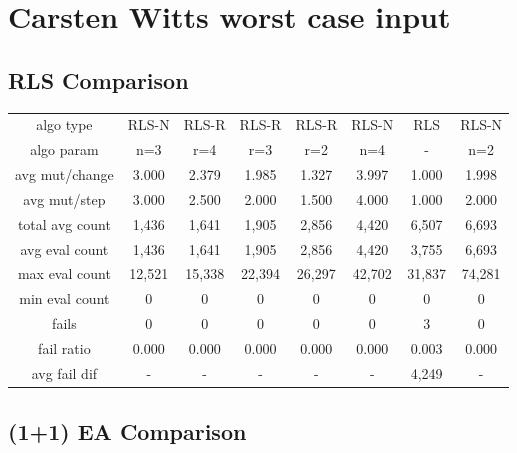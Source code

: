 
\section{Carsten Witts worst case input}

\subsection{RLS Comparison}


\begin{tabular}[h]{cccccccc}
algo type&         RLS-N&  RLS-R&  RLS-R&  RLS-R&  RLS-N&    RLS&  RLS-N\\
algo param&          n=3&    r=4&    r=3&    r=2&    n=4&      -&    n=2\\
avg mut/change&    3.000&  2.379&  1.985&  1.327&  3.997&  1.000&  1.998\\
avg mut/step&      3.000&  2.500&  2.000&  1.500&  4.000&  1.000&  2.000\\
\hline
total avg count&   1,436&  1,641&  1,905&  2,856&  4,420&  6,507&  6,693\\
avg eval count&    1,436&  1,641&  1,905&  2,856&  4,420&  3,755&  6,693\\
max eval count&   12,521& 15,338& 22,394& 26,297& 42,702& 31,837& 74,281\\
min eval count&        0&      0&      0&      0&      0&      0&      0\\
\hline
fails&                 0&      0&      0&      0&      0&      3&      0\\
fail ratio&        0.000&  0.000&  0.000&  0.000&  0.000&  0.003&  0.000\\
avg fail dif&          -&      -&      -&      -&      -&  4,249&      -\\
\end{tabular}


\subsection{(1+1) EA Comparison}


